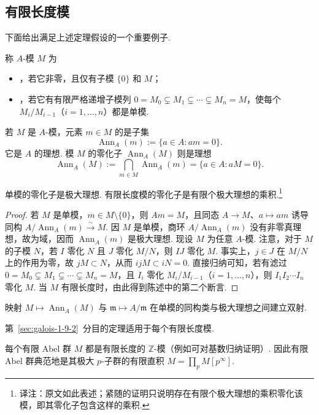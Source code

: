 \subsection{有限长度模}\label{sec:galois-1-9-3}
下面给出满足上述定理假设的一个重要例子.
\begin{definition*}
称 $A$-模 $M$ 为
\begin{itemize}
\item {}，若它非零，且仅有子模 $\{0\}$ 和 $M$；
\item {}，若它有有限严格递增子模列 $0=M_0\subsetneq M_1\subsetneq\cdots\subsetneq M_n=M$，使每个 $M_i/M_{i-1}$（$i=1,\ldots,n$）都是单模.
\end{itemize}
\end{definition*}
若 $M$ 是 $A$-模，元素 $m\in M$ 的是子集
\[\operatorname{Ann}_A(m):=\{a\in A:am=0\}.\]
它是 $A$ 的理想. 模 $M$ 的零化子 $\operatorname{Ann}_A(M)$ 则是理想
\[\operatorname{Ann}_A(M):=\bigcap_{m\in M}\operatorname{Ann}_A(m)=\{a\in A:aM=0\}.\]
\begin{lemma*}
单模的零化子是极大理想. 有限长度模的零化子是有限个极大理想的乘积.\footnote{译注：原文如此表述；紧随的证明只说明存在有限个极大理想的乘积零化该模，即其零化子包含这样的乘积.}
\end{lemma*}
\begin{proof}
若 $M$ 是单模，$m\in M\setminus\{0\}$，则 $Am=M$，且同态 $A\longrightarrow M$、$a\mapsto am$ 诱导同构 $A/\operatorname{Ann}_A(m)\xrightarrow{\sim}M$. 因 $M$ 是单模，商环 $A/\operatorname{Ann}_A(m)$ 没有非零真理想，故为域，因而 $\operatorname{Ann}_A(m)$ 是极大理想. 现设 $M$ 为任意 $A$-模. 注意，对于 $M$ 的子模 $N$，若 $I$ 零化 $N$ 且 $J$ 零化 $M/N$，则 $IJ$ 零化 $M$. 事实上，$j\in J$ 在 $M/N$ 上的作用为零，故 $jM\subset N$，从而 $ijM\subset iN=0$. 直接归纳可知，若有滤过 $0=M_0\subsetneq M_1\subsetneq\cdots\subsetneq M_n=M$，且 $I_i$ 零化 $M_i/M_{i-1}$（$i=1,\ldots,n$），则 $I_1I_2\cdots I_n$ 零化 $M$. 当 $M$ 有限长度时，由此得到陈述中的第二个断言.
\end{proof}
\begin{remark*}
映射 $M\mapsto\operatorname{Ann}_A(M)$ 与 $\mathfrak m\mapsto A/\mathfrak m$ 在单模的同构类与极大理想之间建立双射.
\end{remark*}
\begin{corollary*}
第~\ref{sec:galois-1-9-2}~分目的定理适用于每个有限长度模.
\end{corollary*}
\begin{example*}
每个有限 Abel 群 $M$ 都是有限长度的 $\mathbb Z$-模（例如可对基数归纳证明）. 因此有限 Abel 群典范地是其极大 $p$-子群的有限直积 $M=\prod_p M[p^\infty]$.
\end{example*}
